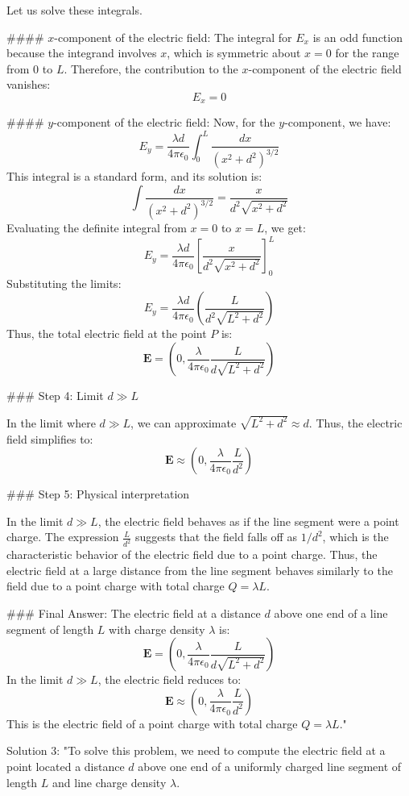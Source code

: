 Let us solve these integrals.

#### \( x \)-component of the electric field:
The integral for \( E_x \) is an odd function because the integrand involves \( x \), which is symmetric about \( x = 0 \) for the range from \( 0 \) to \( L \). Therefore, the contribution to the \( x \)-component of the electric field vanishes:
\[
E_x = 0
\]

#### \( y \)-component of the electric field:
Now, for the \( y \)-component, we have:
\[
E_y = \frac{\lambda d}{4\pi \epsilon_0} \int_0^L \frac{dx}{(x^2 + d^2)^{3/2}}
\]
This integral is a standard form, and its solution is:
\[
\int \frac{dx}{(x^2 + d^2)^{3/2}} = \frac{x}{d^2 \sqrt{x^2 + d^2}}
\]
Evaluating the definite integral from \( x = 0 \) to \( x = L \), we get:
\[
E_y = \frac{\lambda d}{4\pi \epsilon_0} \left[ \frac{x}{d^2 \sqrt{x^2 + d^2}} \right]_0^L
\]
Substituting the limits:
\[
E_y = \frac{\lambda d}{4\pi \epsilon_0} \left( \frac{L}{d^2 \sqrt{L^2 + d^2}} \right)
\]
Thus, the total electric field at the point \( P \) is:
\[
\mathbf{E} = \left( 0, \frac{\lambda}{4\pi \epsilon_0} \frac{L}{d \sqrt{L^2 + d^2}} \right)
\]

### Step 4: Limit \( d \gg L \)

In the limit where \( d \gg L \), we can approximate \( \sqrt{L^2 + d^2} \approx d \). Thus, the electric field simplifies to:
\[
\mathbf{E} \approx \left( 0, \frac{\lambda}{4\pi \epsilon_0} \frac{L}{d^2} \right)
\]

### Step 5: Physical interpretation

In the limit \( d \gg L \), the electric field behaves as if the line segment were a point charge. The expression \( \frac{L}{d^2} \) suggests that the field falls off as \( 1/d^2 \), which is the characteristic behavior of the electric field due to a point charge. Thus, the electric field at a large distance from the line segment behaves similarly to the field due to a point charge with total charge \( Q = \lambda L \).

### Final Answer:
The electric field at a distance \( d \) above one end of a line segment of length \( L \) with charge density \( \lambda \) is:
\[
\mathbf{E} = \left( 0, \frac{\lambda}{4\pi \epsilon_0} \frac{L}{d \sqrt{L^2 + d^2}} \right)
\]
In the limit \( d \gg L \), the electric field reduces to:
\[
\mathbf{E} \approx \left( 0, \frac{\lambda}{4\pi \epsilon_0} \frac{L}{d^2} \right)
\]
This is the electric field of a point charge with total charge \( Q = \lambda L \)."

Solution 3:
"To solve this problem, we need to compute the electric field at a point located a distance \( d \) above one end of a uniformly charged line segment of length \( L \) and line charge density \( \lambda \).

